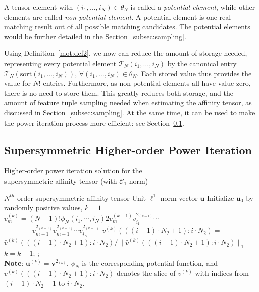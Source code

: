 A tensor element with $(i_1,\ldots,i_N)\in \theta_N$ is called a \emph{potential element}, while other elements are called \emph{non-potential element}.
A potential element is one real matching result out of all possible matching candidates.
The potential elements would be further detailed in the Section~\ref{subsec:sampling}.

Using Definition~\ref{mot:def2}, we now can reduce the amount of storage needed, representing every potential element $\mathcal{T}_N(i_1,\ldots,i_N)$ by the canonical entry $\mathcal{T}_N(\mathrm{sort}(i_1,\ldots,i_N))$, $\forall (i_1,\ldots,i_N)\in \theta_N$. Each stored value thus provides the value for $N!$ entries.
Furthermore, as non-potential elements all have value zero, there is no need to store them.
This greatly reduces both storage, and the amount of feature tuple sampling
needed  when estimating the affinity tensor, as discussed in Section~\ref{subsec:sampling}.
At the same time, it can be used to make the power iteration process more efficient: see Section~\ref{subsec:oursymmhopm}.

\subsection{Supersymmetric Higher-order Power Iteration}
\label{subsec:oursymmhopm}

\begin{algorithm}[!t]
\caption{\small Higher-order power iteration solution for the \protect\\
         \mbox{}\hspace{15ex}\small supersymmetric affinity tensor (with $\mathcal{C}_1$ norm)}
\label{alg2}
\begin{algorithmic}[1]
\REQUIRE \small $N^{th}$-order supersymmetric affinity tensor
\ENSURE  \small Unit $\mathcal{\ell}^1$-norm vector $\boldsymbol{u}$
\STATE   \small \; Initialize $\boldsymbol{u}_0$ by randomly positive values, $k=1$
\REPEAT
        \STATE $v_{m}^{(k)}=(N-1)!\phi_N(i_1,\cdots , i_N) 2v_{m}^{(k-1)}v_{i_1}^{2_{(k-1)}}\cdots$ \\
                 $\qquad \qquad v_{m-1}^{2_{(k-1)}}v_{m+1}^{2_{(k-1)}}\cdots v_{i_N}^{2_{(k-1)}}$
        \ENDFOR
        \STATE $v^{(k)}(((i-1)\cdot N_2+1) : i\cdot N_2)=$   \protect\\
               $\hat{v}^{(k)}(((i-1)\cdot N_2+1) : i\cdot N_2)/\lVert \hat{v}^{(k)}(((i-1)\cdot N_2+1):i\cdot N_2)\lVert_1$
        \ENDFOR
    \ENDFOR
    \STATE $k=k+1$;
;\protect\\
       \small \textbf{Note}: $\boldsymbol{u}^{(k)}=\boldsymbol{v}^{2_{(k)}}$, $\phi_N$ is the corresponding potential function,
       \small and $v^{(k)}(((i-1)\cdot N_2+1) : i\cdot N_2)$ denotes the slice of $v^{(k)}$ with
       \small indices from $(i-1)\cdot N_2+1$ to $i\cdot N_2$.
\end{algorithmic}
\end{algorithm}

